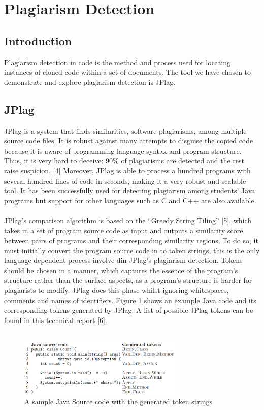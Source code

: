 \section{Plagiarism Detection}

\subsection{Introduction}
Plagiarism detection in code is the method and process used for locating instances of cloned code within a set of documents. The tool we have chosen to demonstrate and explore plagiarism detection is JPlag. 

\subsection{JPlag}
JPlag is a system that finds similarities, software plagiarisms, among multiple source code files. It is robust against many attempts to disguise the copied code because it is aware of programming language syntax and program structure. Thus, it is very hard to deceive: 90\% of plagiarisms are detected and the rest raise suspicion. [4] Moreover, JPlag is able to process a hundred programs with several hundred lines of code in seconds, making it a very robust and scalable tool. 
It has been successfully used for detecting plagiarism among students’ Java programs but support for other languages such as C and C++ are also available.\\\\
JPlag’s comparison algorithm is based on the “Greedy String Tiling” [5], which takes in a set of program source code as input and outputs a similarity score between pairs of programs and their corresponding similarity regions. To do so, it must initially convert the program source code in to token strings, this is the only language dependent process involve din JPlag’s plagiarism detection. Tokens should be chosen in a manner, which captures the essence of the program’s structure rather than the surface aspects, as a program’s structure is harder for plagiarists to modify. JPlag does this phase whilst ignoring whitespaces, comments and names of identifiers. Figure \ref{fig:sample} shows an example Java code and its corresponding tokens generated by JPlag. A list of possible JPlag tokens can be found in this technical report [6].\\\\
\begin{figure} [ht]
\centering
\includegraphics[width=0.7\textwidth]{Figures/samplecode}
\caption{A sample Java Source code with the generated token strings}
\label{fig:sample}
\end{figure}
